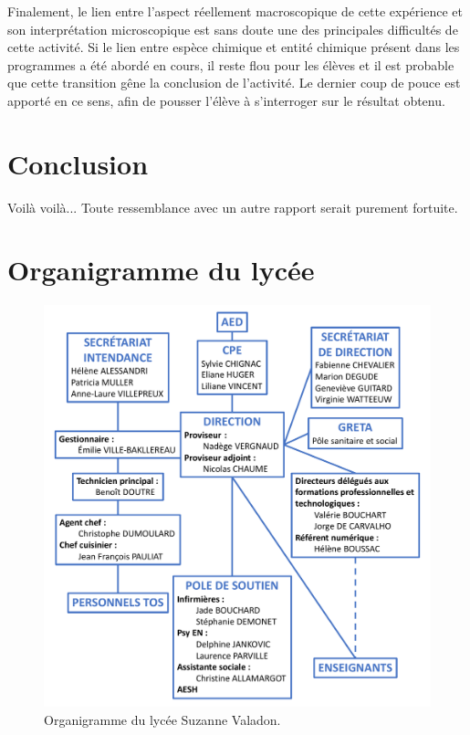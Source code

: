 \documentclass[12pt,a4paper]{article}
\begin{document}
Finalement, le lien entre l'aspect réellement macroscopique de cette expérience et son interprétation microscopique est sans doute une des principales difficultés de cette activité.
Si le lien entre espèce chimique et entité chimique présent dans les programmes a été abordé en cours, il reste flou pour les élèves et il est probable que cette transition gêne la conclusion de l'activité.
Le dernier coup de pouce est apporté en ce sens, afin de pousser l'élève à s'interroger sur le résultat obtenu.

\section*{Conclusion}

Voilà voilà...
Toute ressemblance avec un autre rapport serait purement fortuite.

\newpage


\newpage
\appendix

\section{Organigramme du lycée}
\label{ann:organigramme}

\begin{figure}[h]
\center
\includegraphics[width=\textwidth]{organigramme.pdf}
\caption{Organigramme du lycée Suzanne Valadon.}
\label{fig:organigramme}
\end{figure}
\end{document}
